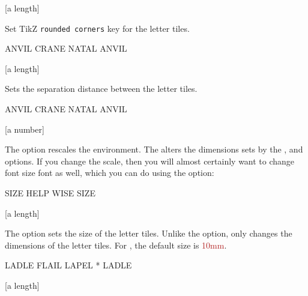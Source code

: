 \documentclass[svgnames]{report}
\begin{document}
  [a length]

  Set TikZ \texttt{rounded corners} key for the  letter tiles.

  \begin{example}
    \begin{wordle}[rounded=2mm]{ANVIL}
      CRANE
      NATAL
      ANVIL
    \end{wordle}
  \end{example}

  [a length]

  Sets the separation distance between the  letter
  tiles.

  \begin{example}
    \begin{wordle}[separation=2mm, borders=black]{ANVIL}
      CRANE
      NATAL
      ANVIL
    \end{wordle}
  \end{example}

  [a number]

  The  option rescales the  environment.
  The  alters the dimensions sets by the ,
    and   options.  If
  you change the scale, then you will almost certainly want
  to change font size font as well, which you can do using the
   option:

  \begin{example}
    \begin{wordle}[scale=1.5, font=\huge\bfseries]{SIZE}
       HELP
       WISE
       SIZE
    \end{wordle}
  \end{example}

  [a length]

  The  option sets the size of the  letter
  tiles. Unlike the  option,  only changes
  the dimensions of the letter tiles. For , the
  default size is \textcolor{FireBrick}{10mm}.

  \begin{example}
    \begin{wordle}[size=10mm, font=\huge\bfseries]{LADLE}
       FLAIL LAPEL * LADLE
    \end{wordle}
  \end{example}

  [a length]
\end{document}
